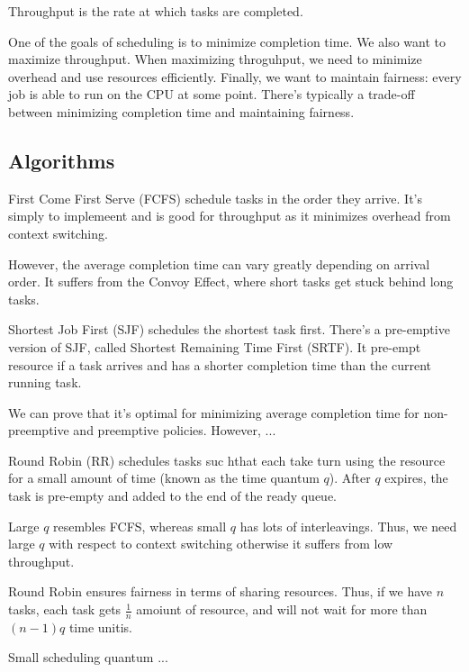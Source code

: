\documentclass[openany]{book}
\begin{document}
\begin{defn}[Throughput]
	Throughput is the rate at which tasks are completed.
\end{defn}
One of the goals of scheduling is to minimize completion time. We also want to maximize throughput. When maximizing throguhput, we need to minimize overhead and use resources efficiently. Finally, we want to maintain fairness: every job is able to run on the CPU at some point. There's typically a trade-off between minimizing completion time and maintaining fairness.

\subsection{Algorithms}
\begin{defn}
	First Come First Serve (FCFS) schedule tasks in the order they arrive. It's simply to implemeent and is good for throughput as it minimizes overhead from context switching.
	
	However, the average completion time can vary greatly depending on arrival order. It suffers from the Convoy Effect, where short tasks get stuck behind long tasks.
\end{defn}

\begin{defn}
	Shortest Job First (SJF) schedules the shortest task first. There's a pre-emptive version of SJF, called Shortest Remaining Time First (SRTF). It pre-empt resource if a task arrives and has a shorter completion time than the current running task.
	
	We can prove that it's optimal for minimizing average completion time for non-preemptive and preemptive policies. However, ...
\end{defn}

\begin{defn}
	Round Robin (RR) schedules tasks suc hthat each take turn using the resource for a small amount of time (known as the time quantum $q$). After $q$ expires, the task is pre-empty and added to the end of the ready queue.
	
	Large $q$ resembles FCFS, whereas small $q$ has lots of interleavings. Thus, we need large $q$ with respect to context switching otherwise it suffers from low throughput.
	
	Round Robin ensures fairness in terms of sharing resources. Thus, if we have $n$ tasks, each task gets $\frac 1 n$ amoiunt of resource, and will not wait for more than $(n-1)q$ time unitis.
	
	Small scheduling quantum ...
\end{defn}
\end{document}
